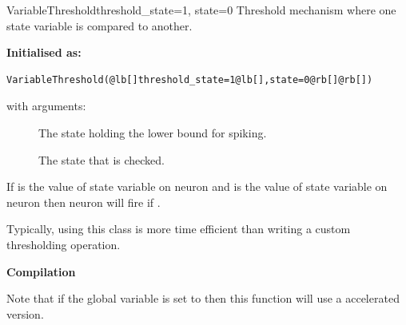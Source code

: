 \documentclass[letterpaper,10pt]{manual}
\begin{document}
\hypertarget{brian.VariableThreshold}{}\begin{classdesc}{VariableThreshold}{threshold\_state=1, state=0}
Threshold mechanism where one state variable is compared to another.

\textbf{Initialised as:}

\begin{Verbatim}[commandchars=@\[\]]
VariableThreshold(@lb[]threshold_state=1@lb[],state=0@rb[]@rb[])
\end{Verbatim}

with arguments:
\begin{description}
\item[]
The state holding the lower bound for spiking.

\item[]
The state that is checked.

\end{description}

If  is the value of state variable  on neuron
 and  is the value of state variable  on neuron
 then neuron  will fire if .

Typically, using this class is more time efficient than writing
a custom thresholding operation.

\textbf{Compilation}

Note that if the global variable  is set to 
then this function will use a  accelerated version.
\end{classdesc}
\end{document}
